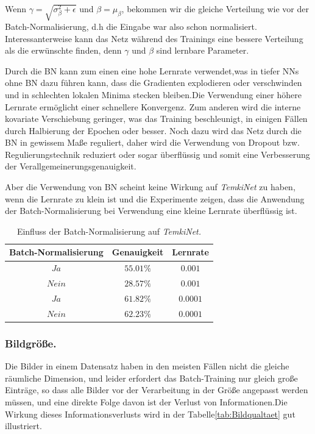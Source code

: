 \documentclass[12pt,a4paper]{scrartcl}
\numberwithin{equation}{section}
\begin{document}
Wenn $\gamma = \sqrt{\sigma_\beta^2 + \epsilon}$ und $\beta = \mu_\beta $, bekommen wir die gleiche Verteilung wie vor der Batch-Normalisierung, d.h die Eingabe war also schon normalisiert. Interessanterweise kann das Netz während des Trainings eine bessere Verteilung als die erwünschte finden, denn $\gamma$ und $\beta$ sind lernbare Parameter.

Durch die BN kann zum einen eine hohe Lernrate verwendet,was in tiefer \acsp{NN} ohne BN dazu führen kann, dass die Gradienten explodieren oder verschwinden und in schlechten lokalen Minima stecken bleiben.Die Verwendung einer höhere Lernrate ermöglicht einer schnellere Konvergenz.
Zum anderen wird die interne kovariate Verschiebung geringer, was das Training beschleunigt, in einigen Fällen durch Halbierung der Epochen oder besser. Noch dazu wird das Netz durch die BN in gewissem Maße reguliert, daher wird die Verwendung von Dropout bzw. Regulierungstechnik reduziert oder sogar überflüssig und somit eine Verbesserung der Verallgemeinerungsgenauigkeit.

Aber die Verwendung von BN scheint keine Wirkung auf \textit{TemkiNet} zu haben, wenn die Lernrate zu klein ist und die Experimente zeigen, dass die Anwendung der Batch-Normalisierung bei Verwendung eine kleine Lernrate überflüssig ist.

\begin{table}[ht]
	\centering
	\begin{tabular}{*{3}{|c}| }
		\hline
		Batch-Normalisierung 	& Genauigkeit & Lernrate\\ \hline
		$ Ja $		&$ 55.01\% $  &$0.001$ 	\\ \hline	
		$ Nein $	&$28.57 \% $  &$0.001 $	\\ \hline
		$ Ja $		&$ 61.82\% $  &$0.0001$	\\ \hline
		$ Nein $	&$ 62.23\% $  &$0.0001$	\\ \hline

	\end{tabular}
	\caption{Einfluss der Batch-Normalisierung auf \textit{TemkiNet.}}
	\label{tab:batchnormalisierung}
\end{table}
 
\subsubsection{Bildgröße.}	
	Die Bilder in einem Datensatz haben in den meisten Fällen nicht die gleiche räumliche Dimension, und leider erfordert das Batch-Training nur gleich große Einträge, so dass alle Bilder vor der Verarbeitung in der Größe angepasst werden müssen, und eine direkte Folge davon ist der Verlust von Informationen.Die Wirkung dieses Informationsverlusts wird in der Tabelle\ref{tab:Bildqualtaet} gut illustriert.
	
\end{document}
